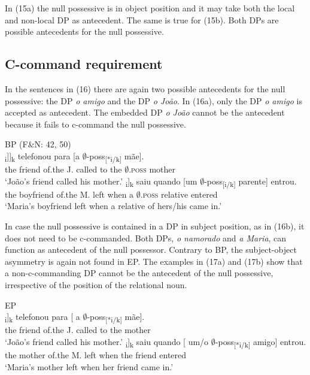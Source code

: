 \documentclass[output=paper]{langsci/langscibook}
\begin{document}
In (15a) the null possessive is in object position and it may take both the local and non-local DP as antecedent. The same is true for (15b). Both DPs are possible antecedents for the null possessive.

\subsection{C-command requirement}%

In the sentences in (16) there are again two possible antecedents for the null possessive: the DP \textit{o amigo} and the DP \textit{o João}. In (16a), only the DP \textit{o amigo} is accepted as antecedent. The embedded DP \textit{o João} cannot be the antecedent because it fails to c-command the null possessive.

\ea%
    BP (F\&N: 42, 50)\label{ex:wein:16}\\
    \ea
    \gll\relax [O amigo [d[o João]\textsubscript{i}]]\textsubscript{k} telefonou para [a $\emptyset$-poss\textsubscript{[}\textsubscript{*i/k]} mãe].\\
         the friend of.the J. called to the $\emptyset$\textsc{.poss} mother\\
    \glt ‘João’s friend called his mother.’
    \ex  
    \gll\relax [O namorado d[a Maria]\textsubscript{i}]\textsubscript{k} saiu quando [um $\emptyset$-poss\textsubscript{[i/}\textsubscript{k]} parente] entrou.\\
         the boyfriend of.the M. left when a $\emptyset$\textsc{.poss} relative entered\\
    \glt ‘Maria’s boyfriend left when a relative of hers\slash his came in.’
    \z
\z

In case the null possessive is contained in a DP in subject position, as in (16b), it does not need to be c-commanded. Both DPs, \textit{o namorado} and \textit{a Maria}, can function as antecedent of the null possessor. Contrary to BP, the subject-object asymmetry is again not found in EP. The examples in (17a) and (17b) show that a non-c-commanding DP cannot be the antecedent of the null possessive, irrespective of the position of the relational noun.

\ea%
    EP\label{ex:wein:17}\\
    \ea
    \gll [ O amigo d[o João]\textsubscript{i}]\textsubscript{k} telefonou para [ a $\emptyset$-poss\textsubscript{[*}\textsubscript{i/k]} mãe].\\
         {} the friend of.the J. called to {} the {} mother\\
    \glt ‘João’s friend called his mother.’
    \ex  
    \gll [ A mãe d[a Maria]\textsubscript{i}]\textsubscript{k} saiu quando [ um/o $\emptyset$-poss\textsubscript{[*i/k]} amigo] entrou. \\
         {} the mother of.the M. left when {} the {} friend entered \\
    \glt ‘Maria’s mother left when her friend came in.’ 
    \z
\z
\end{document}
